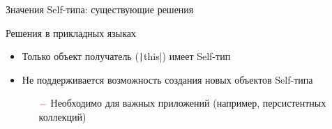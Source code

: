 \documentclass[usenames, dvipsnames]{beamer}
\begin{document}
\begin{frame}[fragile]{Значения Self-типа: существующие решения}
        \begin{block}{Решения в прикладных языках}
            \begin{itemize}
                \item Только объект получатель (\texttt|this|) имеет Self-тип
                \item Не поддерживается возможность создания новых объектов Self-типа
                \begin{itemize}
                    \item[$\color{red} -$] Необходимо для важных приложений (например, персистентных коллекций)
                \end{itemize}
            \end{itemize}
        \end{block}
    \end{frame}
\end{document}
